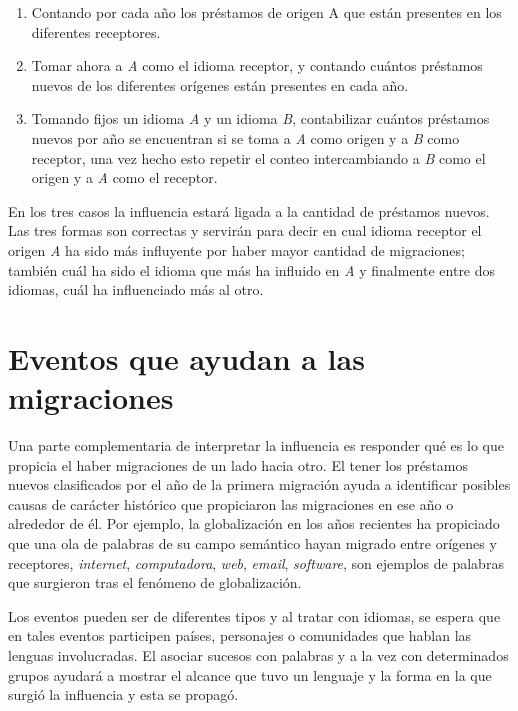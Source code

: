 \begin{enumerate}
	
	\item Contando por cada año los préstamos de origen A que están presentes en los diferentes receptores.
	
	\item Tomar ahora a \textit{A} como el idioma receptor, y contando cuántos préstamos nuevos de los diferentes orígenes están presentes en cada año. 

	\item Tomando fijos un idioma \textit{A} y un idioma \textit{B},  contabilizar cuántos préstamos nuevos por año se encuentran si se toma a \textit{A} como origen y a \textit{B} como receptor,  una vez hecho esto  repetir el conteo intercambiando a \textit{B} como el origen y a \textit{A} como el receptor. 

\end{enumerate}


En los tres casos la influencia estará ligada a la cantidad de préstamos nuevos.  Las tres formas son correctas y servirán para decir en cual idioma receptor  el origen \textit{A} ha sido más influyente por haber mayor cantidad de migraciones; también cuál ha sido el idioma  que más ha influido en \textit{A} y finalmente entre dos idiomas,  cuál ha influenciado más al otro. 




\section{Eventos que ayudan a las migraciones}

Una parte complementaria de interpretar la influencia es responder qué es lo que propicia el haber migraciones de un lado hacia otro.  El tener los préstamos nuevos clasificados por el año de la primera migración ayuda a identificar posibles causas de carácter histórico que propiciaron las migraciones en ese año o alrededor de él.  Por ejemplo, la globalización en los años recientes ha propiciado que una ola de palabras de su campo semántico hayan migrado entre orígenes y receptores,  \textit{internet}, \textit{computadora}, \textit{web}, \textit{email},  \textit{software}, son ejemplos de palabras que surgieron tras el fenómeno de globalización. 

Los eventos pueden ser de diferentes tipos y al tratar con idiomas, se espera que en tales eventos participen países, personajes o  comunidades que hablan  las lenguas involucradas.  El asociar sucesos con palabras y a la vez con determinados grupos ayudará a mostrar el alcance que tuvo un lenguaje y la forma en la que surgió la influencia y esta se propagó. 

